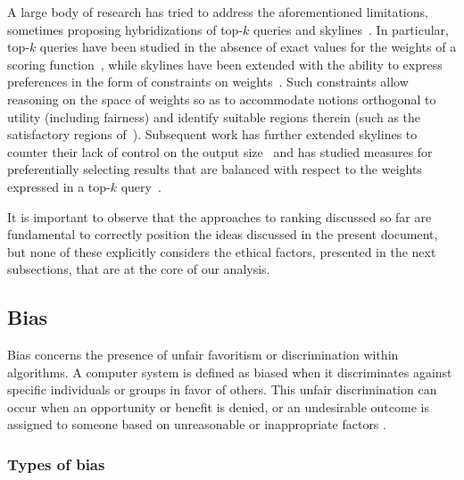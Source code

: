 A large body of research has tried to address the aforementioned limitations, sometimes proposing hybridizations of top-$k$ queries and skylines~\cite{DBLP:journals/pvldb/CiacciaM17,DBLP:journals/tods/CiacciaM20,DBLP:conf/cikm/CiacciaM18,DBLP:conf/sebd/CiacciaM18,DBLP:conf/sisap/BedoCMO19,DBLP:conf/sebd/CiacciaM19,DBLP:conf/sigmod/MouratidisL021}. In particular, top-$k$ queries have been studied in the absence of exact values for the weights of a scoring function~\cite{soliman2011ranking}, while skylines have been extended with the ability to express preferences in the form of constraints on weights~\cite{DBLP:journals/pvldb/CiacciaM17}. Such constraints
allow reasoning on the space of weights so as to accommodate notions orthogonal to utility (including fairness) and identify suitable regions therein (such as the satisfactory regions of~\cite{asudeh2019designing}). Subsequent work has further extended skylines to counter their lack of control on the output size~\cite{DBLP:conf/sigmod/MouratidisL021} and has studied measures for preferentially selecting results that are balanced with respect to the weights expressed in a top-$k$ query~\cite{DBLP:journals/paccmod/CiacciaM25}.

It is important to observe that the approaches to ranking discussed so far are fundamental to correctly position the ideas discussed in the present document, but none of these explicitly considers the ethical factors, presented in the next subsections, that are at the core of our analysis.

\subsection{Bias}
\label{sec:bias}


Bias concerns the presence of unfair favoritism or discrimination within algorithms.
A computer system is defined as biased when it discriminates against specific individuals or groups in favor of others. This unfair discrimination can occur when an opportunity or benefit is denied, or an undesirable outcome is assigned to someone based on unreasonable or inappropriate factors \cite{friedman1996bias}.

\subsubsection{Types of bias}
\label{subsec:bias_types}

